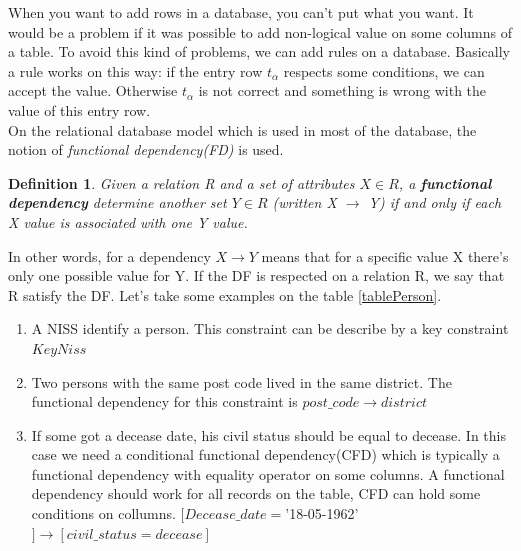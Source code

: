 \documentclass[letterpaper, 12pt]{report}
\newtheorem{mydef}{Definition}
\begin{document}
When you want to add rows in a database, you can't put what you want. It would be a problem if it was possible to add non-logical value on some columns of a table. To avoid this kind of problems, we can add rules on a database. Basically a rule works on this way: if the entry row $t_\alpha$ respects some conditions, we can accept the value. Otherwise $t_\alpha$ is not correct and something is wrong with the value of this entry row.\\


On the relational database model which is used in most of the database, the notion of \emph{functional dependency(FD)} is used. 

\begin{mydef}
Given a relation R and a set of attributes $X \in R$, a \textbf{functional dependency} determine another set $Y \in R$ (written X $\rightarrow$ Y) if and only if each X value is associated with one Y value.
\end{mydef} 

In other words, for a dependency $X \rightarrow Y$ means that for a specific value X there's only one possible value for Y. If the DF is respected on a relation R, we say that R satisfy the DF. Let's take some examples on the table \ref{tablePerson}.

\begin{enumerate}
\item A NISS identify a person. This constraint can be describe by a key constraint $Key{Niss}$
\item Two persons with the same post code lived in the same district. The functional dependency for this constraint is $post\_code \rightarrow district$
\item If some got a decease date, his civil status should be equal to decease. In this case we need a conditional functional dependency(CFD) which is typically a functional dependency with equality operator on some columns. A functional dependency should work for all records on the table, CFD can hold some conditions on collumns. $[Decease\_date = $'18-05-1962'$] \rightarrow [civil\_status = decease]$
\end{enumerate}
 
\end{document}

